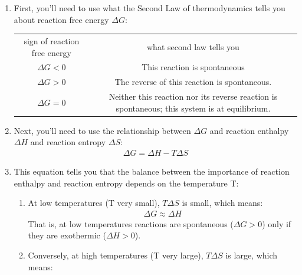 \documentclass{article}  %
\begin{document}
\begin{enumerate}
    \item First, you'll need to use what the Second Law of thermodynamics tells you about reaction free energy $\Delta G$:
        \begin{center}
            \begin{tabular}{c c}
                sign of reaction free energy & what second law tells you \\
                $\Delta G < 0$ & This reaction is spontaneous \\
                $\Delta G > 0$ & The reverse of this reaction is spontaneous. \\
                $\Delta G = 0$ & Neither this reaction nor its reverse reaction is spontaneous; this system is at equilibrium.
            \end{tabular}
        \end{center}
    \item Next, you'll need to use the relationship between $\Delta G$ and reaction enthalpy $\Delta H$ and reaction entropy $\Delta S$:
        \begin{equation*}
            \begin{aligned}
                \Delta G = \Delta H - T\Delta S 
            \end{aligned}
        \end{equation*}
    \item  This equation tells you that the balance between the importance of reaction enthalpy and reaction entropy depends on the temperature T:
        \begin{enumerate}
            \item At low temperatures (T very small), $T \Delta S$ is small, which means:
                \begin{equation*}
                    \begin{aligned}
                        \Delta G \approx \Delta H 
                    \end{aligned}
                \end{equation*}
                That is, at low temperatures reactions are spontaneous ($\Delta G >  0$) only if they are exothermic ($\Delta H > 0$).
            \item Conversely, at high temperatures (T very large), $T\Delta S$ is large, which means:
                \begin{equation*}
                    \begin{aligned}

\end{aligned}
\end{equation*}
\end{enumerate}
\end{enumerate}
\end{document}
